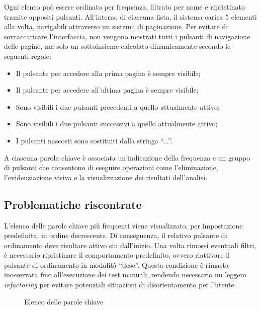 \vspace{5pt}
\par\noindent Ogni elenco può essere ordinato per frequenza, filtrato per nome e ripristinato tramite appositi pulsanti. All’interno di ciascuna lista, il sistema carica 5 elementi alla volta, navigabili attraverso un sistema di paginazione. Per evitare di sovraccaricare l’interfaccia, non vengono mostrati tutti i pulsanti di navigazione delle pagine, ma solo un sottoinsieme calcolato dinamicamente secondo le seguenti regole:
\begin{itemize}
  \item Il pulsante per accedere alla prima pagina è sempre visibile;
  \item Il pulsante per accedere all’ultima pagina è sempre visibile;
  \item Sono visibili i due pulsanti precedenti a quello attualmente attivo;
  \item Sono visibili i due pulsanti successivi a quello attualmente attivo;
  \item I pulsanti nascosti sono sostituiti dalla stringa “...”.
\end{itemize}

\vspace{5pt}
\par\noindent A ciascuna parola chiave è associata un’indicazione della frequenza e un gruppo di pulsanti che consentono di eseguire operazioni come l’eliminazione, l’evidenziazione visiva e la visualizzazione dei risultati dell’analisi.

\subsection{Problematiche riscontrate}

\par L’elenco delle parole chiave più frequenti viene visualizzato, per impostazione predefinita, in ordine decrescente. Di conseguenza, il relativo pulsante di ordinamento deve risultare attivo sin dall’inizio. Una volta rimossi eventuali filtri, è necessario ripristinare il comportamento predefinito, ovvero riattivare il pulsante di ordinamento in modalità “desc”. Questa condizione è rimasta inosservata fino all’esecuzione dei test manuali, rendendo necessario un leggero \textit{refactoring} per evitare potenziali situazioni di disorientamento per l’utente.

\begin{figure}[H]
  \centering 
  \caption{Elenco delle parole chiave}
\end{figure}

